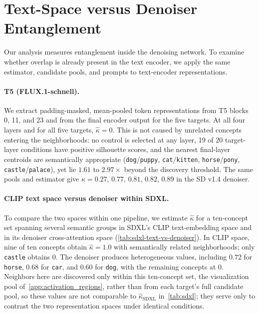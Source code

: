 \section{Text-Space versus Denoiser Entanglement}\label{app:textspace}
Our analysis measures entanglement inside the denoising network. To examine
whether overlap is already present in the text encoder, we apply the same
estimator, candidate pools, and prompts to text-encoder representations.

\paragraph{T5 (FLUX.1-schnell).} We extract padding-masked, mean-pooled token
representations from T5 blocks 0, 11, and 23 and from the final encoder output
for the five targets. At all four layers and for all five targets,
$\hat\kappa=0$. This is not caused by unrelated concepts entering the
neighborhoods: no control is selected at any layer, 19 of 20 target-layer
conditions have positive silhouette scores, and the nearest final-layer
centroids are semantically appropriate (\texttt{dog}/\texttt{puppy},
\texttt{cat}/\texttt{kitten}, \texttt{horse}/\texttt{pony},
\texttt{castle}/\texttt{palace}), yet lie $1.61$ to $2.97\times$ beyond the
discovery threshold. The same pools and estimator give
$\hat\kappa=0.27$, $0.77$, $0.81$, $0.82$, $0.89$ in the SD v1.4 denoiser.

\paragraph{CLIP text space versus denoiser within SDXL.} To compare the two
spaces within one pipeline, we estimate $\hat\kappa$ for a ten-concept set
spanning several semantic groups in SDXL's CLIP text-embedding space and in its
denoiser cross-attention space (\cref{tab:sdxl-text-vs-denoiser}). In CLIP space, nine of ten concepts obtain
$\hat\kappa=1.0$ with semantically related neighborhoods; only \texttt{castle}
obtains $0$. The denoiser produces heterogeneous values, including $0.72$ for
\texttt{horse}, $0.68$ for \texttt{car}, and $0.60$ for \texttt{dog}, with the
remaining concepts at $0$. Neighbors here are discovered only within this
ten-concept set, the visualization pool of~\cref{app:activation_regions},
rather than from each target's full candidate pool, so these values are not
comparable to $\hat\kappa_{\text{SDXL}}$ in~\cref{tab:sdxl}; they serve only to
contrast the two representation spaces under identical conditions.

